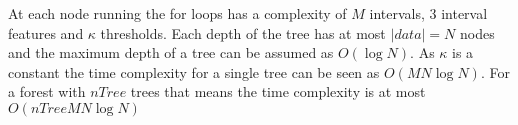At each node running the for loops has a complexity 
of $M$ intervals, 3 interval features and $\kappa$ thresholds.
Each depth of the tree has at most $|data| = N$ nodes and the maximum depth of a tree can be assumed
as $O(\log N)$. As $\kappa$ is a constant the time complexity
for a single tree can be seen as $O(M N \log N)$. For a forest 
with $nTree$ trees that means the time complexity is at most $O(nTree M N \log N)$
